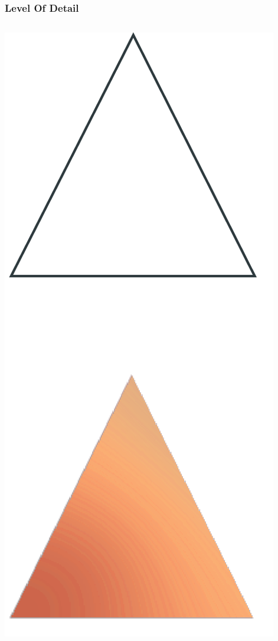 	\begin{frame}
		\frametitle{Level Of Detail}
		\begin{columns}
			\begin{column}[b]{0.22\textwidth}
				\begin{center}
					\includegraphics[width=\textwidth]{./img/1_single/lod_lod0.png}

\end{center}
\end{column}
\end{columns}
\end{frame}
